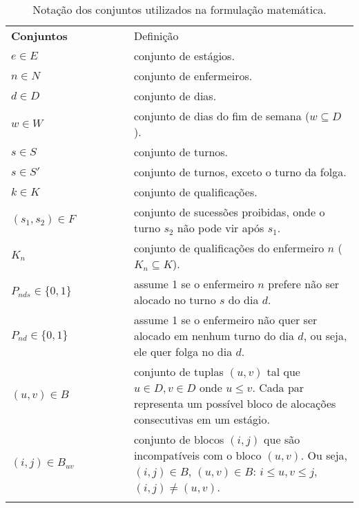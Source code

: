 \documentclass[cic,tc, twoside]{iiufrgs}
\begin{document}
\begin{table}[H]
\centering
\caption{Notação dos conjuntos utilizados na formulação matemática.}
\small
\begin{tabularx}{\linewidth}{l@{}X}
\hline\noalign{\smallskip}
\textbf{Conjuntos}{~~~~~~~~~~}  & Definição  \\
\noalign{\smallskip}\hline\noalign{\smallskip}
	$e \in E$  & conjunto de estágios. \\
	$n \in N$  & conjunto de enfermeiros. \\
	$d \in D$  & conjunto de dias. \\
	$w \in W$  & conjunto de dias do fim de semana ($w \subseteq D$). \\
	$s \in S$  & conjunto de turnos. \\
	$s \in S'$  & conjunto de turnos, exceto o turno da folga. \\
	$k \in K$  & conjunto de qualificações. \\
	$(s_1, s_2) \in F$  & conjunto de sucessões proibidas, onde o turno $s_2$ não pode vir após $s_1$. \\ 
	$K_n$  & conjunto de qualificações do enfermeiro $n$ ($K_n \subseteq K$). \\
	$P_{nds} \in \{0,1\}$ & assume 1 se o enfermeiro $n$ prefere não ser alocado no turno $s$ do dia $d$. \\
	$P_{nd} \in \{0,1\}$ &  assume 1 se o enfermeiro não quer ser alocado em nenhum turno do dia $d$, ou seja, ele quer folga no dia $d$.\\
	$(u,v) \in B$ & conjunto de tuplas $(u,v)$ tal que $u \in D, v \in D$ onde $u \leq v$. Cada par representa um possível bloco de alocações consecutivas em um estágio.  \\
	$(i,j) \in B_{uv}$ & conjunto de blocos $(i,j)$ que são incompatíveis com o bloco $(u,v)$. Ou seja, $(i,j) \in B$, $(u,v) \in B$: $i \leq u, v \leq j$, $(i,j) \neq (u,v)$.\\
\noalign{\smallskip}\hline
\end{tabularx}
\label{tab:conjuntos}
\end{table}
\end{document}
